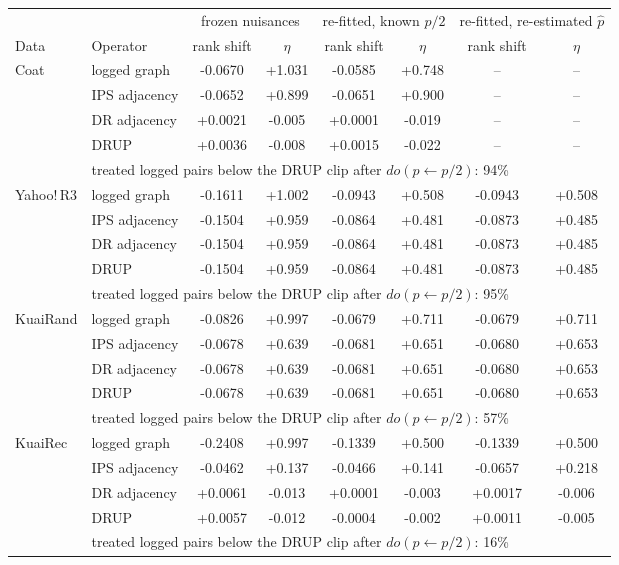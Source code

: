 \begin{tabular}{llcccccc}
\toprule
 & & \multicolumn{2}{c}{frozen nuisances} & \multicolumn{2}{c}{re-fitted, known $p/2$} & \multicolumn{2}{c}{re-fitted, re-estimated $\hat p$}\\
Data & Operator & rank shift & $\eta$ & rank shift & $\eta$ & rank shift & $\eta$\\
\midrule
Coat & logged graph & -0.0670 & +1.031 & -0.0585 & +0.748 & -- & --\\
 & IPS adjacency & -0.0652 & +0.899 & -0.0651 & +0.900 & -- & --\\
 & DR adjacency & +0.0021 & -0.005 & +0.0001 & -0.019 & -- & --\\
 & DRUP & +0.0036 & -0.008 & +0.0015 & -0.022 & -- & --\\
 & \multicolumn{7}{l}{\footnotesize treated logged pairs below the DRUP clip after $do(p\leftarrow p/2)$: 94\%}\\
\midrule
Yahoo!\,R3 & logged graph & -0.1611 & +1.002 & -0.0943 & +0.508 & -0.0943 & +0.508\\
 & IPS adjacency & -0.1504 & +0.959 & -0.0864 & +0.481 & -0.0873 & +0.485\\
 & DR adjacency & -0.1504 & +0.959 & -0.0864 & +0.481 & -0.0873 & +0.485\\
 & DRUP & -0.1504 & +0.959 & -0.0864 & +0.481 & -0.0873 & +0.485\\
 & \multicolumn{7}{l}{\footnotesize treated logged pairs below the DRUP clip after $do(p\leftarrow p/2)$: 95\%}\\
\midrule
KuaiRand & logged graph & -0.0826 & +0.997 & -0.0679 & +0.711 & -0.0679 & +0.711\\
 & IPS adjacency & -0.0678 & +0.639 & -0.0681 & +0.651 & -0.0680 & +0.653\\
 & DR adjacency & -0.0678 & +0.639 & -0.0681 & +0.651 & -0.0680 & +0.653\\
 & DRUP & -0.0678 & +0.639 & -0.0681 & +0.651 & -0.0680 & +0.653\\
 & \multicolumn{7}{l}{\footnotesize treated logged pairs below the DRUP clip after $do(p\leftarrow p/2)$: 57\%}\\
\midrule
KuaiRec & logged graph & -0.2408 & +0.997 & -0.1339 & +0.500 & -0.1339 & +0.500\\
 & IPS adjacency & -0.0462 & +0.137 & -0.0466 & +0.141 & -0.0657 & +0.218\\
 & DR adjacency & +0.0061 & -0.013 & +0.0001 & -0.003 & +0.0017 & -0.006\\
 & DRUP & +0.0057 & -0.012 & -0.0004 & -0.002 & +0.0011 & -0.005\\
 & \multicolumn{7}{l}{\footnotesize treated logged pairs below the DRUP clip after $do(p\leftarrow p/2)$: 16\%}\\
\bottomrule
\end{tabular}
